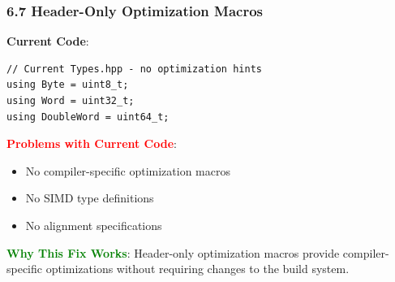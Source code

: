 \documentclass[11pt,a4paper]{article}
\begin{document}
\subsubsection{6.7 Header-Only Optimization Macros}

\textbf{Current Code}:
\begin{lstlisting}
// Current Types.hpp - no optimization hints
using Byte = uint8_t;
using Word = uint32_t;
using DoubleWord = uint64_t;
\end{lstlisting}

\textcolor{red}{\textbf{Problems with Current Code}}:
\begin{itemize}
    \item No compiler-specific optimization macros
    \item No SIMD type definitions
    \item No alignment specifications
\end{itemize}

\textcolor{green}{\textbf{Why This Fix Works}}: Header-only optimization macros provide compiler-specific optimizations without requiring changes to the build system.
\end{document}

